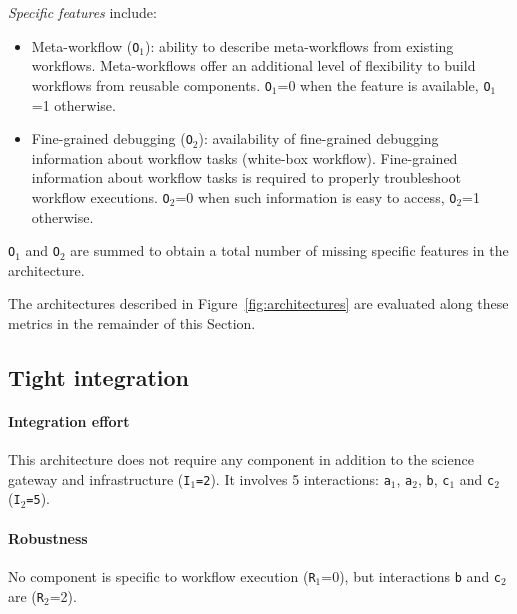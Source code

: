 \documentclass[preprint,3p,twocolumn]{elsarticle}
\begin{document}
\emph{Specific features} include:
\begin{itemize}[leftmargin=0cm,itemindent=0.35cm,itemsep=0cm]
\item Meta-workflow (\texttt{O$_1$}): ability to describe
  meta-workflows from existing workflows. Meta-workflows offer an
  additional level of flexibility to build workflows from reusable
  components. \texttt{O$_1$}=0 when the feature is available,
  \texttt{O$_1$}=1 otherwise.
\item Fine-grained debugging (\texttt{O$_2$}): availability of
  fine-grained debugging information about workflow tasks (white-box
  workflow).  Fine-grained information about workflow tasks is
  required to properly troubleshoot workflow executions.
  \texttt{O$_2$}=0 when such information is easy to access,
  \texttt{O$_2$}=1 otherwise.
\end{itemize}
\texttt{O$_1$} and \texttt{O$_2$} are summed to obtain a total number of missing specific
features in the architecture.


The architectures described in Figure~\ref{fig:architectures} are
evaluated along these metrics in the remainder of this Section.

\subsection{Tight integration}

\paragraph{Integration effort} This architecture does not require any
component in addition to the science gateway and infrastructure
(\texttt{I$_1$=2}). It involves 5 interactions: \texttt{a$_1$},
\texttt{a$_2$}, \texttt{b}, \texttt{c$_1$} and \texttt{c$_2$}
(\texttt{I$_2$=5}).

\paragraph{Robustness} No component is specific to workflow execution
(\texttt{R$_1$}=0), but interactions \texttt{b} and \texttt{c$_2$} are
(\texttt{R$_2$}=2).
\end{document}

